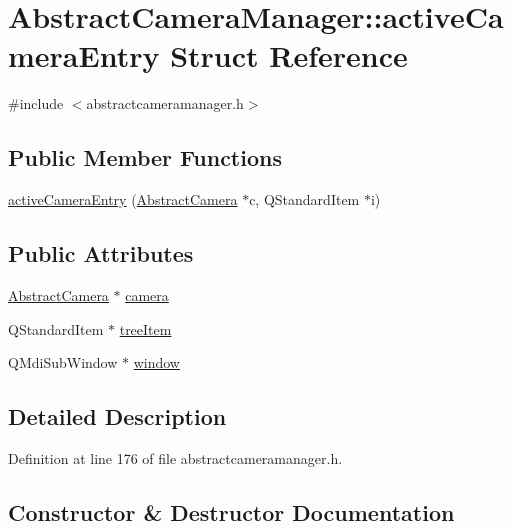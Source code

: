 \hypertarget{struct_abstract_camera_manager_1_1active_camera_entry}{}\section{Abstract\+Camera\+Manager\+::active\+Camera\+Entry Struct Reference}
\label{struct_abstract_camera_manager_1_1active_camera_entry}


{\ttfamily \#include $<$abstractcameramanager.\+h$>$}

\subsection*{Public Member Functions}
\begin{DoxyCompactItemize}
\item 
\mbox{\hyperlink{struct_abstract_camera_manager_1_1active_camera_entry_a6cd26565097ec88f489c7b0396704533}{active\+Camera\+Entry}} (\mbox{\hyperlink{class_abstract_camera}{Abstract\+Camera}} $\ast$c, Q\+Standard\+Item $\ast$i)
\end{DoxyCompactItemize}
\subsection*{Public Attributes}
\begin{DoxyCompactItemize}
\item 
\mbox{\hyperlink{class_abstract_camera}{Abstract\+Camera}} $\ast$ \mbox{\hyperlink{struct_abstract_camera_manager_1_1active_camera_entry_ac03f9c68e2f8fd20f100512780f45cbb}{camera}}
\item 
Q\+Standard\+Item $\ast$ \mbox{\hyperlink{struct_abstract_camera_manager_1_1active_camera_entry_add95e09b5b0c854f15cbf73311f9ffb1}{tree\+Item}}
\item 
Q\+Mdi\+Sub\+Window $\ast$ \mbox{\hyperlink{struct_abstract_camera_manager_1_1active_camera_entry_a58a76914d71ad9d8b3ab6b16849e7161}{window}}
\end{DoxyCompactItemize}


\subsection{Detailed Description}


Definition at line 176 of file abstractcameramanager.\+h.



\subsection{Constructor \& Destructor Documentation}
\mbox{\label{struct_abstract_camera_manager_1_1active_camera_entry_a6cd26565097ec88f489c7b0396704533}} 
